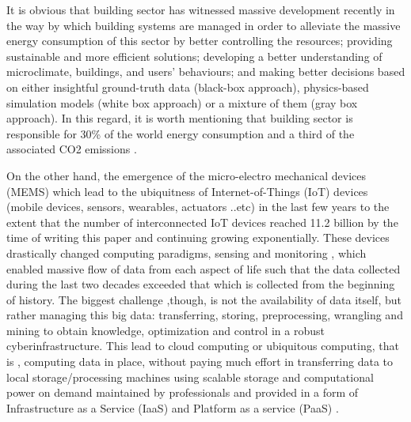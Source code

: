 It is obvious that building sector has witnessed massive development recently in the way by which building systems are managed in order to alleviate the massive energy consumption of this sector by better controlling the resources; providing sustainable and more efficient solutions; developing a better understanding of microclimate, buildings, and users' behaviours; and making better decisions based on either insightful ground-truth data (black-box approach), physics-based simulation models (white box approach) or a mixture of them (gray box approach). In this regard, it is worth mentioning that building sector is responsible for 30\% of the world energy consumption and a third of the associated CO2 emissions \citet{Iea2013TrackingMinisterial}.

On the other hand, the emergence of the micro-electro mechanical devices (MEMS) which lead to the ubiquitness of Internet-of-Things (IoT) devices (mobile devices, sensors, wearables, actuators ..etc) in the last few years to the extent that the number of interconnected IoT devices reached 11.2 billion by the time of writing this paper and continuing growing exponentially. These devices drastically changed computing paradigms, sensing and monitoring \citet{Ramaswamy2015InternetReview}, which enabled massive flow of data from each aspect of life such that the data collected during the last two decades exceeded that which is collected from the beginning of history. The biggest challenge ,though, is not the availability of data itself, but rather managing this big data: transferring, storing, preprocessing, wrangling and mining to obtain knowledge, optimization and control in a robust cyberinfrastructure. This lead to cloud computing or ubiquitous computing, that is , computing data in place, without paying much effort in transferring data to local storage/processing machines using scalable storage and computational power on demand maintained by professionals and provided in a form of Infrastructure as a Service (IaaS) and Platform as a service (PaaS) \cite{MellTheTechnology,Bhardwaj2010CLOUDIAAS,Dillon2010CloudChallenges}.

